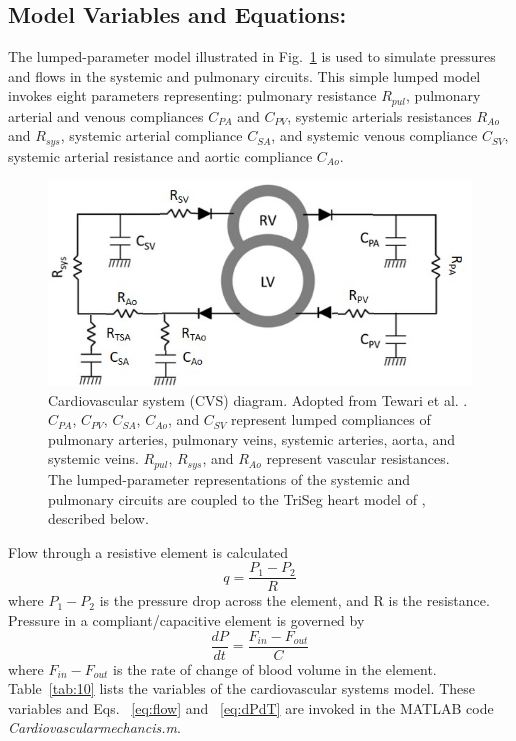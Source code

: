 \documentclass[fleqn,10pt]{physiome}
\begin{document}
\subsection{Model Variables and Equations:}

The lumped-parameter model illustrated in Fig.~\ref{fig:CVS} is used to simulate pressures and flows in the systemic and pulmonary circuits. This simple lumped model invokes eight parameters representing: pulmonary resistance $R_{pul}$, pulmonary arterial and venous compliances $C_{PA}$ and $C_{PV}$, systemic arterials resistances $R_{Ao}$ and $R_{sys}$, systemic arterial compliance $C_{SA}$, and systemic venous compliance $C_{SV}$, systemic arterial resistance and aortic compliance $C_{Ao}$. 
\begin{figure}[ht]\centering
\includegraphics[width=0.65\linewidth]{CVS.jpg}
\caption{Cardiovascular system (CVS) diagram. Adopted from Tewari et al. \cite{Tewari2016a,Tewari2016b}. $C_{PA}$, $C_{PV}$, $C_{SA}$, $C_{Ao}$, and $C_{SV}$ represent lumped compliances of pulmonary arteries, pulmonary veins, systemic arteries, aorta, and systemic veins. $R_{pul}$, $R_{sys}$, and $R_{Ao}$ represent vascular resistances. The lumped-parameter representations of the systemic and pulmonary circuits are coupled to the TriSeg heart model of \cite{Lumens2009}, described below.}\label{fig:CVS}
\end{figure}

Flow through a resistive element is calculated
\begin{equation}\label{eq:flow}
    q =\frac{P_{1} - P_{2}}{R}
\end{equation}
where $P_{1} - P_{2}$ is the pressure drop across the element, and R is the resistance. Pressure in a compliant/capacitive element is governed by
\begin{equation}\label{eq:dPdT}
    \frac{dP}{dt} =\frac{F_{in} - F_{out}}{C} 
\end{equation}
where $F_{in} - F_{out}$ is the rate of change of blood volume in the element.
Table~\ref{tab:10} lists the variables of the cardiovascular systems model. These variables and Eqs. ~\ref{eq:flow} and ~\ref{eq:dPdT} are invoked in the MATLAB code {\em Cardiovascularmechancis.m}.
\end{document}
